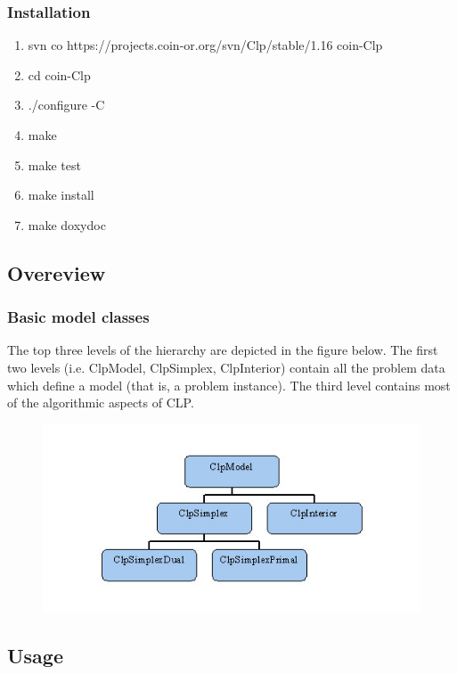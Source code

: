 \documentclass{beamer}
\begin{document}
\begin{frame}
	\frametitle{Installation}
	\begin{enumerate}
		\item svn co https://projects.coin-or.org/svn/Clp/stable/1.16 coin-Clp
	 	\item cd coin-Clp
	 	\item ./configure -C
	 	\item make 
	 	\item make test
	 	\item make install
	 	\item make doxydoc
	\end{enumerate}
\end{frame}


\subsection{Overeview}

\begin{frame}
 	\frametitle{Basic model classes}
  The top three levels of the hierarchy are depicted in the figure below. The first two levels (i.e. ClpModel, ClpSimplex, ClpInterior) contain all the problem data which define a model (that is, a problem instance). The third level contains most of the algorithmic aspects of CLP.
  \begin{figure}
  	\includegraphics[width=0.8\linewidth]{clpbasicmodelhier}
  \end{figure}
\end{frame}


\subsection{Usage}
{
\begin{frame}[fragile]
	\inputminted{cpp}{examples/simplex_minimum.cpp}
\end{frame}
}
\end{document}

